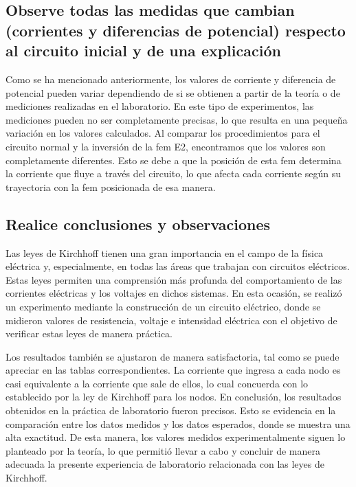 \documentclass[letterpaper, 12pt]{article}
\begin{document}
\subsection{Observe todas las medidas que cambian (corrientes y diferencias de potencial) respecto
	al circuito inicial y de una explicación}

Como se ha mencionado anteriormente, los valores de
corriente y diferencia de potencial pueden variar
dependiendo de si se obtienen a partir de la teoría o de
mediciones realizadas en el laboratorio. En este tipo de
experimentos, las mediciones pueden no ser completamente
precisas, lo que resulta en una pequeña variación en los
valores calculados. Al comparar los procedimientos para el
circuito normal y la inversión de la fem E2, encontramos
que los valores son completamente diferentes. Esto se debe
a que la posición de esta fem determina la corriente que
fluye a través del circuito, lo que afecta cada corriente
según su trayectoria con la fem posicionada de esa manera.

\subsection{Realice conclusiones y observaciones}

Las leyes de Kirchhoff tienen una gran importancia en el
campo de la física eléctrica y, especialmente, en todas las
áreas que trabajan con circuitos eléctricos. Estas leyes
permiten una comprensión más profunda del comportamiento de
las corrientes eléctricas y los voltajes en dichos
sistemas. En esta ocasión, se realizó un experimento
mediante la construcción de un circuito eléctrico, donde se
midieron valores de resistencia, voltaje e intensidad
eléctrica con el objetivo de verificar estas leyes de
manera práctica.

Los resultados también se ajustaron de manera
satisfactoria, tal como se puede apreciar en las tablas
correspondientes. La corriente que ingresa a cada nodo es
casi equivalente a la corriente que sale de ellos, lo cual
concuerda con lo establecido por la ley de Kirchhoff para
los nodos. En conclusión, los resultados obtenidos en la
práctica de laboratorio fueron precisos. Esto se evidencia
en la comparación entre los datos medidos y los datos
esperados, donde se muestra una alta exactitud. De esta
manera, los valores medidos experimentalmente siguen lo
planteado por la teoría, lo que permitió llevar a cabo y
concluir de manera adecuada la presente experiencia de
laboratorio relacionada con las leyes de Kirchhoff.
\end{document}
